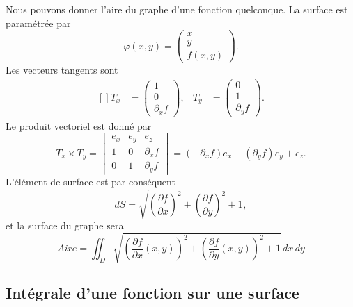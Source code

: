 \begin{example}
	Nous pouvons donner l'aire du graphe d'une fonction quelconque. La surface est paramétrée par
	\begin{equation}
		\varphi(x,y)=\begin{pmatrix}
			x \\
			y \\
			f(x,y)
		\end{pmatrix}.
	\end{equation}
	Les vecteurs tangents sont
	\begin{equation}
		\begin{aligned}[]
			T_x & =\begin{pmatrix}
				1 \\
				0 \\
				\partial_xf
			\end{pmatrix}, & T_y & =\begin{pmatrix}
				0 \\
				1 \\
				\partial_yf
			\end{pmatrix}.
		\end{aligned}
	\end{equation}
	Le produit vectoriel est donné par
	\begin{equation}
		T_x\times T_y=\begin{vmatrix}
			e_x & e_y & e_z         \\
			1   & 0   & \partial_xf \\
			0   & 1   & \partial_yf
		\end{vmatrix}=(-\partial_xf)e_x-(\partial_yf)e_y+e_z.
	\end{equation}
	L'élément de surface est par conséquent
	\begin{equation}
		dS=\sqrt{\left( \frac{ \partial f }{ \partial x } \right)^2+\left( \frac{ \partial f }{ \partial y } \right)^2+1},
	\end{equation}
	et la surface du graphe sera
	\begin{equation}
		Aire=\iint_D\sqrt{\left( \frac{ \partial f }{ \partial x }(x,y) \right)^2+\left( \frac{ \partial f }{ \partial y }(x,y) \right)^2+1}\,dx\,dy
	\end{equation}

\end{example}

\subsection{Intégrale d'une fonction sur une surface}

